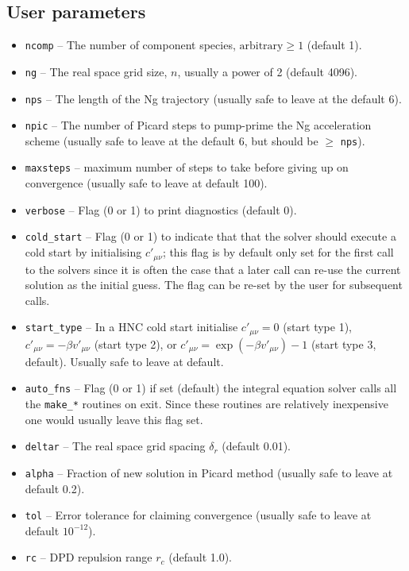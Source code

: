 \documentclass[12pt,a4paper]{article}
\begin{document}
\subsection{User parameters}
%
\begin{itemize}
%
\item\verb+ncomp+ -- The number of component species, $\text{arbitrary}\ge
  1$ (default 1).
%
\item\verb+ng+ -- The real space grid size, $n$, usually a power of 2
  (default 4096).
%
\item\verb+nps+ -- The length of the Ng trajectory (usually safe to
  leave at the default 6).
%
\item\verb+npic+ -- The number of Picard steps to pump-prime the Ng
  acceleration scheme (usually safe to leave at the default 6, but
  should be $\ge$ \verb+nps+).
%
\item\verb+maxsteps+ -- maximum number of steps to take before giving up on
convergence (usually safe to leave at default 100).
%
\item\verb+verbose+ -- Flag (0 or 1) to print diagnostics (default 0).
%
\item\verb+cold_start+ -- Flag (0 or 1) to indicate that that the
  solver should execute a cold start by initialising $c'_{\mu\nu}$;
  this flag is by default only set for the first call to the solvers
  since it is often the case that a later call can re-use the current
  solution as the initial guess.  The flag can be re-set by the user
  for subsequent calls.
%
\item\verb+start_type+ -- In a HNC cold start initialise
  $c'_{\mu\nu}=0$ (start type 1), $c'_{\mu\nu}=-\beta v'_{\mu\nu}$
  (start type 2), or $c'_{\mu\nu}=\exp(-\beta v'_{\mu\nu})-1$ (start
  type 3, default).  Usually safe to leave at default.
%
\item\verb+auto_fns+ -- Flag (0 or 1) if set (default) the integral
  equation solver calls all the \verb+make_*+ routines on exit.  Since
  these routines are relatively inexpensive one would usually leave
  this flag set.
%
\item\verb+deltar+ -- The real space grid spacing $\delta_r$ (default 0.01).
%
\item\verb+alpha+ -- Fraction of new solution in Picard method
  (usually safe to leave at default 0.2).
%
\item\verb+tol+ -- Error tolerance for claiming convergence (usually
  safe to leave at default $10^{-12}$).
%
\item\verb+rc+ -- DPD repulsion range $r_c$ (default 1.0).

\end{itemize}
\end{document}
